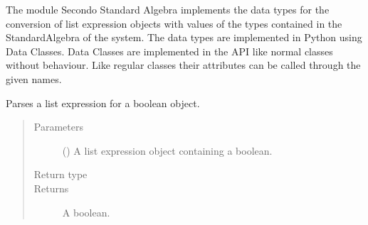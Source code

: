 \documentclass[letterpaper,10pt,english]{sphinxmanual}
\begin{document}
\label{\detokenize{index:module-secondodb.api.algebras.secondostandardalgebra}}
The module Secondo Standard Algebra implements the data types for the conversion of list expression objects with values
of the types contained in the StandardAlgebra of the  system. The data types are implemented in Python
using Data Classes. Data Classes are implemented in the API like normal classes without behaviour.
Like regular classes their attributes can be called through the given names.

\begin{fulllineitems}
\label{\detokenize{index:secondodb.api.algebras.secondostandardalgebra.parse_bool}}
Parses a list expression for a boolean object.
\begin{quote}\begin{description}
\item[{Parameters}] \leavevmode
{} () \textendash{} A list expression object containing a boolean.

\item[{Return type}] \leavevmode
{}

\item[{Returns}] \leavevmode
A boolean.

\end{description}\end{quote}

\end{fulllineitems}

\end{document}
